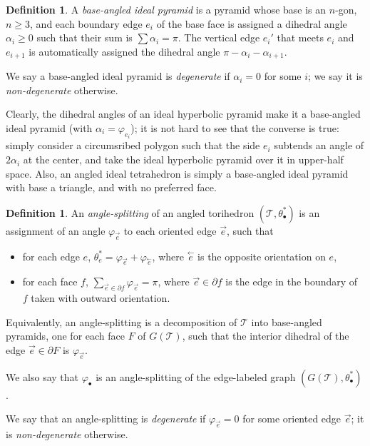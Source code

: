 \documentclass[11pt]{amsart}
\newcommand{\sT}{{\mathcal{T}}}
\newcommand{\cev}[1]{\overset{\leftarrow}{#1}}
\newcommand{\del}{\partial}
\newcommand{\vphi}{\varphi}
\theoremstyle{plain}
\theoremstyle{definition}
\newtheorem{define}[theorem]{Definition}
\newtheorem{definition}[theorem]{Definition}
\begin{document}
\begin{define}
A \emph{base-angled ideal pyramid}
is a pyramid whose base is an $n$-gon, $n \geq 3$,
and each boundary edge $e_i$ of the base face is assigned a dihedral angle
$\alpha_i \geq 0$ such that their sum is $\sum \alpha_i = \pi$.
The vertical edge $e_i'$ that meets $e_i$ and $e_{i+1}$
is automatically assigned the dihedral angle $\pi - \alpha_i - \alpha_{i+1}$.


We say a base-angled ideal pyramid is \emph{degenerate} if
$\alpha_i = 0$ for some $i$; we say it is \emph{non-degenerate} otherwise.
\end{define}


Clearly, the dihedral angles of an ideal hyperbolic pyramid
make it a base-angled ideal pyramid
(with $\alpha_i = \vphi_{e_i}$);
it is not hard to see that the converse is true:
simply consider a circumsribed polygon such that the side $e_i$
subtends an angle of $2\alpha_i$ at the center,
and take the ideal hyperbolic pyramid over it in upper-half space.
Also, an angled ideal tetrahedron is simply a base-angled ideal pyramid
with base a triangle, and with no preferred face.

\begin{definition}
An \emph{angle-splitting} of an angled torihedron $(\sT,\theta_\bullet^*)$
is an assignment of an angle $\vphi_{\vec{e}}$ to each
oriented edge $\vec{e}$, such that

\begin{itemize}
\item for each edge $e$,
$\theta_e^* = \vphi_{\vec{e}} + \vphi_{\cev{e}}$,
where $\cev{e}$ is the opposite orientation on $e$,
\item for each face $f$,
$\sum_{\vec{e} \in \del f} \vphi_{\vec{e}} = \pi$,
where $\vec{e} \in \del f$ is the edge in the boundary of $f$
taken with outward orientation.
\end{itemize}


Equivalently, an angle-splitting is a decomposition of
$\sT$ into base-angled pyramids,
one for each face $F$ of $G(\sT)$, such that
the interior dihedral of the edge $\vec{e} \in \del F$
is $\vphi_{\vec{e}}$.


We also say that $\vphi_\bullet$ is an angle-splitting
of the edge-labeled graph $(G(\sT), \theta_\bullet^*)$.


We say that an angle-splitting is \emph{degenerate}
if $\vphi_{\vec{e}} = 0$ for some oriented edge $\vec{e}$;
it is \emph{non-degenerate} otherwise.
\end{definition}
\end{document}
